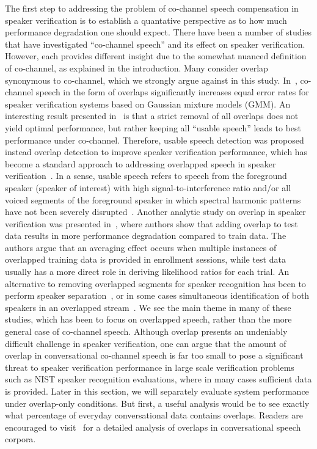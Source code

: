 \documentclass[journal]{IEEEtran}
\begin{document}
The first step to addressing the problem of co-channel speech compensation in speaker verification is to establish a quantative perspective as to how much performance degradation one should expect. 
There have been a number of studies that have investigated ``co-channel speech'' and its effect on speaker verification. 
However, each provides different insight due to the somewhat nuanced definition of co-channel, as explained in the introduction. 
Many consider overlap synonymous to co-channel, which we strongly argue against in this study. 
In~\cite{yantorno_work}, co-channel speech in the form of overlaps significantly increases equal error rates for speaker verification systems based on Gaussian mixture models (GMM). 
An interesting result presented in~\cite{yantorno_work} is that a strict removal of all overlaps does not yield optimal performance, but rather keeping all ``usable speech'' leads to best performance under co-channel.  
Therefore, usable speech detection was proposed instead overlap detection to improve speaker verification performance, which has become a standard approach to addressing overlapped speech in speaker verification~\cite{shao_wang_icassp03, shao_wang_jp}. 
In a sense, usable speech refers to speech from the foreground speaker (speaker of interest) with high signal-to-interference ratio and/or all voiced segments of the foreground speaker in which spectral harmonic patterns have not been severely disrupted~\cite{smolenski_magazine}. 
Another analytic study on overlap in speaker verification was presented in~\cite{navid_pyknogram_jp}, where authors show that adding overlap to test data results in more performance degradation compared to train data. 
The authors argue that an averaging effect occurs when multiple instances of overlapped training data is provided in enrollment sessions, while test data usually has a more direct role in deriving likelihood ratios for each trial. 
An alternative to removing overlapped segments for speaker recognition has been to perform speaker separation~\cite{ssr_saiedi_icpr_2010, ssr_mowlaee_icassp2010}, or in some cases simultaneous identification of both speakers in an overlapped stream~\cite{zhao_wang_wang_ieeetrans_2015, sadjadi_heck_icassp14}. 
We see the main theme in many of these studies, which has been to focus on overlapped speech, rather than the more general case of co-channel speech. 
Although overlap presents an undeniably difficult challenge in speaker verification, one can argue that the amount of overlap in conversational co-channel speech is far too small to pose a significant threat to speaker verification performance in large scale verification problems such as NIST speaker recognition evaluations, where in many cases sufficient data is provided. 
Later in this section, we will separately evaluate system performance under overlap-only conditions. But first, a useful analysis would be to see exactly what percentage of everyday conversational data contains overlaps. 
Readers are encouraged to visit~\cite{shriberg} for a detailed analysis of overlaps in conversational speech corpora. 
\end{document}
